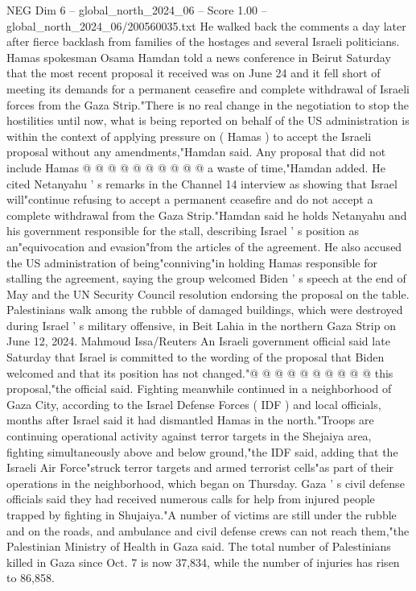 \begin{textsample}{NEG Dim 6 – global\_north\_2024\_06 – Score 1.00 – global\_north\_2024\_06/200560035.txt}
He walked back the comments a day later after fierce backlash from families of the hostages and several Israeli politicians.
Hamas spokesman Osama Hamdan told a news conference in Beirut Saturday that the most recent proposal it received was on June 24 and it fell short of meeting its demands for a permanent ceasefire and complete withdrawal of Israeli forces from the Gaza Strip."There is no real change in the negotiation to stop the hostilities until now, what is being reported on behalf of the US administration is within the context of applying pressure on ( Hamas ) to accept the Israeli proposal without any amendments,"Hamdan said.
Any proposal that did not include Hamas @ @ @ @ @ @ @ @ @ @ a waste of time,"Hamdan added.
He cited Netanyahu ' s remarks in the Channel 14 interview as showing that Israel will"continue refusing to accept a permanent ceasefire and do not accept a complete withdrawal from the Gaza Strip."Hamdan said he holds Netanyahu and his government responsible for the stall, describing Israel ' s position as an"equivocation and evasion"from the articles of the agreement.
He also accused the US administration of being"conniving"in holding Hamas responsible for stalling the agreement, saying the group welcomed Biden ' s speech at the end of May and the UN Security Council resolution endorsing the proposal on the table.
Palestinians walk among the rubble of damaged buildings, which were destroyed during Israel ' s military offensive, in Beit Lahia in the northern Gaza Strip on June 12, 2024.
Mahmoud Issa/Reuters An Israeli government official said late Saturday that Israel is committed to the wording of the proposal that Biden welcomed and that its position has not changed."@ @ @ @ @ @ @ @ @ @ this proposal,"the official said.
Fighting meanwhile continued in a neighborhood of Gaza City, according to the Israel Defense Forces ( IDF ) and local officials, months after Israel said it had dismantled Hamas in the north."Troops are continuing operational activity against terror targets in the Shejaiya area, fighting simultaneously above and below ground,"the IDF said, adding that the Israeli Air Force"struck terror targets and armed terrorist cells"as part of their operations in the neighborhood, which began on Thursday.
Gaza ' s civil defense officials said they had received numerous calls for help from injured people trapped by fighting in Shujaiya."A number of victims are still under the rubble and on the roads, and ambulance and civil defense crews can not reach them,"the Palestinian Ministry of Health in Gaza said.
The total number of Palestinians killed in Gaza since Oct. 7 is now 37,834, while the number of injuries has risen to 86,858.

\end{textsample}
